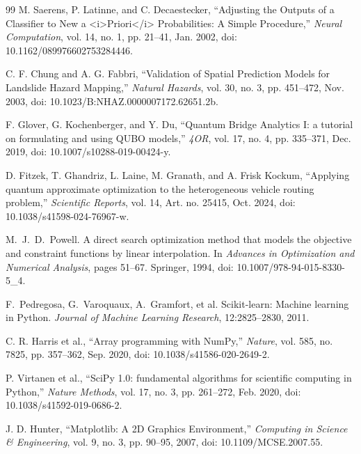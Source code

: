 \documentclass[10pt,twocolumn]{article}
\begin{document}
{\begin{thebibliography}{99}
M. Saerens, P. Latinne, and C. Decaestecker, ``Adjusting the Outputs of a Classifier to New a <i>Priori</i> Probabilities: A Simple Procedure,'' \emph{Neural Computation}, vol. 14, no. 1, pp. 21--41, Jan. 2002, doi: 10.1162/089976602753284446.

C. F. Chung and A. G. Fabbri, ``Validation of Spatial Prediction Models for Landslide Hazard Mapping,'' \emph{Natural Hazards}, vol. 30, no. 3, pp. 451--472, Nov. 2003, doi: 10.1023/B:NHAZ.0000007172.62651.2b.

F. Glover, G. Kochenberger, and Y. Du, ``Quantum Bridge Analytics I: a tutorial on formulating and using QUBO models,'' \emph{4OR}, vol. 17, no. 4, pp. 335--371, Dec. 2019, doi: 10.1007/s10288-019-00424-y.

D. Fitzek, T. Ghandriz, L. Laine, M. Granath, and A. Frisk Kockum, ``Applying quantum approximate optimization to the heterogeneous vehicle routing problem,'' \emph{Scientific Reports}, vol. 14, Art. no. 25415, Oct. 2024, doi: 10.1038/s41598-024-76967-w.

M.~J.~D.~Powell. A direct search optimization method that models the objective and constraint functions by linear interpolation. In \emph{Advances in Optimization and Numerical Analysis}, pages 51--67. Springer, 1994, doi: 10.1007/978-94-015-8330-5\_4.

F.~Pedregosa, G.~Varoquaux, A.~Gramfort, et al. Scikit-learn: Machine learning in Python. \emph{Journal of Machine Learning Research}, 12:2825--2830, 2011.

C. R. Harris et al., ``Array programming with NumPy,'' \emph{Nature}, vol. 585, no. 7825, pp. 357--362, Sep. 2020, doi: 10.1038/s41586-020-2649-2.

P. Virtanen et al., ``SciPy 1.0: fundamental algorithms for scientific computing in Python,'' \emph{Nature Methods}, vol. 17, no. 3, pp. 261--272, Feb. 2020, doi: 10.1038/s41592-019-0686-2.

J. D. Hunter, ``Matplotlib: A 2D Graphics Environment,'' \emph{Computing in Science \& Engineering}, vol. 9, no. 3, pp. 90--95, 2007, doi: 10.1109/MCSE.2007.55.

\end{thebibliography}
}
\end{document}
